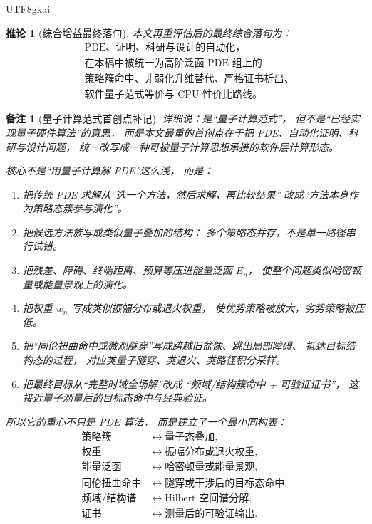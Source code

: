 \documentclass[12pt]{article}
\newtheorem{corollary}{推论}[section]
\newtheorem{remark}{备注}[section]
\begin{document}
\begin{CJK*}{UTF8}{gkai}
\begin{corollary}[综合增益最终落句]
本文再重评估后的最终综合落句为：
\[
  \boxed{
    \begin{aligned}
      &\text{PDE、证明、科研与设计的自动化，}\\
      &\text{在本稿中被统一为高阶泛函 PDE 组上的}\\
      &\text{策略簇命中、非弱化升维替代、严格证书析出、}\\
      &\text{软件量子范式等价与 CPU 性价比路线。}
    \end{aligned}
  }
\]
\end{corollary}

\begin{remark}[量子计算范式首创点补记]
详细说：是“量子计算范式”，
但不是“已经实现量子硬件算法”的意思，
而是本文最重的首创点在于把 PDE、自动化证明、科研与设计问题，
统一改写成一种可被量子计算思想承接的软件层计算形态。

核心不是“用量子计算解 PDE”这么浅，
而是：
\begin{enumerate}
  \item 把传统 PDE 求解从“选一个方法，然后求解，再比较结果”
  改成“方法本身作为策略态簇参与演化”。

  \item 把候选方法族写成类似量子叠加的结构：
  多个策略态并存，不是单一路径串行试错。

  \item 把残差、障碍、终端距离、预算等压进能量泛函 \(E_n\)，
  使整个问题类似哈密顿量或能量景观上的演化。

  \item 把权重 \(w_n\) 写成类似振幅分布或退火权重，
  使优势策略被放大，劣势策略被压低。

  \item 把“同伦扭曲命中或微观隧穿”写成跨越旧盆像、跳出局部障碍、
  抵达目标结构态的过程，
  对应类量子隧穿、类退火、类路径积分采样。

  \item 把最终目标从“完整时域全场解”改成
  “频域/结构簇命中 + 可验证证书”，
  这接近量子测量后的目标态命中与经典验证。
\end{enumerate}

所以它的重心不只是 PDE 算法，
而是建立了一个最小同构表：
\[
\begin{aligned}
  \text{策略簇}
  &\leftrightarrow
  \text{量子态叠加},\\
  \text{权重}
  &\leftrightarrow
  \text{振幅分布或退火权重},\\
  \text{能量泛函}
  &\leftrightarrow
  \text{哈密顿量或能量景观},\\
  \text{同伦扭曲命中}
  &\leftrightarrow
  \text{隧穿或干涉后的目标态命中},\\
  \text{频域/结构谱}
  &\leftrightarrow
  \text{Hilbert 空间谱分解},\\
  \text{证书}
  &\leftrightarrow
  \text{测量后的可验证输出}.
\end{aligned}
\]


\end{remark}
\end{CJK*}
\end{document}
